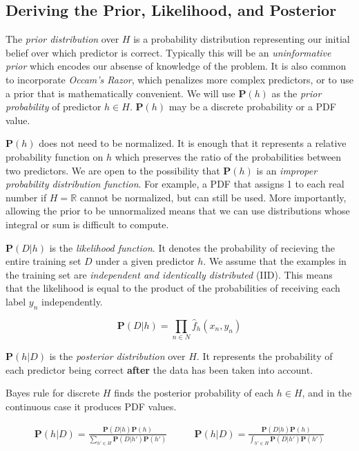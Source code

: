 \documentclass[twoside]{article}
\begin{document}
\subsection{Deriving the Prior, Likelihood, and Posterior}

The \textit{prior distribution} over \(H\) is a probability distribution representing our initial belief over which predictor is correct. Typically this will be an \textit{uninformative prior} which encodes our absense of knowledge of the problem. It is also common to incorporate \textit{Occam's Razor}, which penalizes more complex predictors, or to use a prior that is mathematically convenient. We will use \(\mathbf{P}(h)\) as the \textit{prior probability} of predictor \(h \in H\). \(\mathbf{P}(h)\) may be a discrete probability or a PDF value.

\(\mathbf{P}(h)\) does not need to be normalized. It is enough that it represents a relative probability function on \(h\) which preserves the ratio of the probabilities between two predictors. We are open to the possibility that \(\mathbf{P}(h)\) is an \textit{improper probability distribution function}. For example, a PDF that assigns 1 to each real number if \(H=\mathbb{R}\) cannot be normalized, but can still be used. More importantly, allowing the prior to be unnormalized means that we can use distributions whose integral or sum is difficult to compute.

\(\mathbf{P}(D|h)\) is the \textit{likelihood function}. It denotes the probability of recieving the entire training set \(D\) under a given predictor \(h\). We assume that the examples in the training set are \textit{independent and identically distributed} (IID). This means that the likelihood is equal to the product of the probabilities of receiving each label \(y_n\) independently.

\begin{equation}
\label{eq:likelihood_expansion}
\mathbf{P}(D|h)=\prod_{n \in N} \hat{f}_h(x_n,y_n)
\end{equation}

\(\mathbf{P}(h|D)\) is the \textit{posterior distribution} over \(H\). It represents the probability of each predictor being correct \textbf{after} the data has been taken into account.

Bayes rule for discrete \(H\) finds the posterior probability of each \(h \in H\), and in the continuous case it produces PDF values.

\begin{align}
\mathbf{P}(h|D)=\frac{\mathbf{P}(D|h)\mathbf{P}(h)}{\sum_{h' \in H}\mathbf{P}(D|h')\mathbf{P}(h')} &
\qquad\mathbf{P}(h|D)=\frac{\mathbf{P}(D|h)\mathbf{P}(h)}{\int_{h' \in H}\mathbf{P}(D|h')\mathbf{P}(h')}
\end{align}
\end{document}
